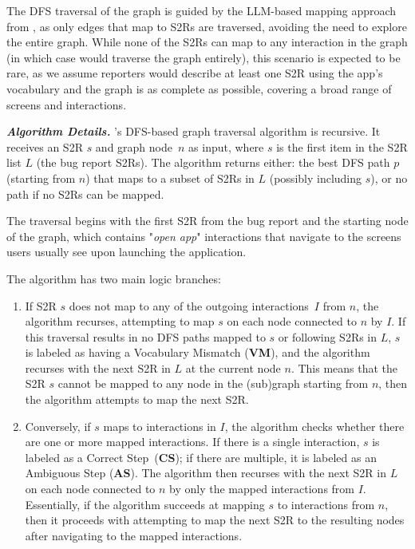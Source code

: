 The DFS traversal of the graph is guided by the LLM-based mapping approach from , as only edges that map to S2Rs are traversed, avoiding the need to explore the entire graph. 
While none of the S2Rs can map to any interaction in the graph (in which case \tool would traverse the graph entirely), this scenario is expected to be rare, as we assume reporters would describe at least one S2R using the app’s vocabulary and the graph is as complete as possible, covering a broad range of screens and interactions.

\textbf{\textit{Algorithm Details.}} 
\tool's DFS-based graph traversal algorithm is recursive. 
It receives an S2R $s$ and graph node~$n$ as input, where $s$ is the first item in the S2R list $L$ (the bug report S2Rs). 
The algorithm returns either: the best DFS path $p$ (starting from $n$) that maps to a subset of S2Rs in $L$ (possibly including $s$), or no path if no S2Rs can be mapped. 

The traversal begins with the first S2R from the bug report and the starting node of the graph, which contains "\textit{open app}" interactions that navigate to the screens users usually see upon launching the application. 

The algorithm has two main logic branches:
\begin{enumerate}
	\item If S2R $s$ does not map to any of the outgoing interactions~$I$ from $n$, the algorithm recurses, attempting to map  $s$ on each node connected to $n$ by $I$.  If this traversal results in no DFS paths mapped to $s$ or following S2Rs in $L$, $s$ is labeled as having a Vocabulary Mismatch (\textbf{VM}), and the algorithm recurses with the next S2R in $L$ at the current node $n$. 
	This means that the S2R $s$ cannot be mapped to any node in the (sub)graph starting from $n$, then the algorithm attempts to map the next S2R.
	\item Conversely, if $s$ maps to interactions in $I$, the algorithm checks whether there are one or more mapped interactions. If there is a single interaction, $s$ is labeled as a Correct Step~(\textbf{CS}); if there are multiple, it is labeled as an Ambiguous Step (\textbf{AS}). 
	The algorithm then recurses with the next S2R in $L$ on each node connected to $n$ by only the mapped interactions from $I$. 
	Essentially, if the algorithm succeeds at mapping $s$ to interactions from $n$, then it proceeds with attempting to map the next S2R to the resulting nodes after navigating to the mapped interactions.
\end{enumerate}

